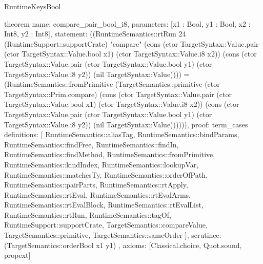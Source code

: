 \begin{lexlean}{RuntimeKeysBool}
\begin{semanticmodule}
theorem{
  name: compare_pair_bool_i8,
  parameters: [x1 : Bool, y1 : Bool, x2 : Int8, y2 : Int8],
  statement: ((RuntimeSemantics::rtRun 24 (RuntimeSupport::supportCrate) "compare" (cons (ctor TargetSyntax::Value.pair (ctor TargetSyntax::Value.bool x1) (ctor TargetSyntax::Value.i8 x2)) (cons (ctor TargetSyntax::Value.pair (ctor TargetSyntax::Value.bool y1) (ctor TargetSyntax::Value.i8 y2)) (nil TargetSyntax::Value)))) = (RuntimeSemantics::fromPrimitive (TargetSemantics::primitive (ctor TargetSyntax::Prim.compare) (cons (ctor TargetSyntax::Value.pair (ctor TargetSyntax::Value.bool x1) (ctor TargetSyntax::Value.i8 x2)) (cons (ctor TargetSyntax::Value.pair (ctor TargetSyntax::Value.bool y1) (ctor TargetSyntax::Value.i8 y2)) (nil TargetSyntax::Value)))))),
  proof: term_cases{
    definitions: [
      RuntimeSemantics::aliasTag,
      RuntimeSemantics::bindParams,
      RuntimeSemantics::findFree,
      RuntimeSemantics::findIn,
      RuntimeSemantics::findMethod,
      RuntimeSemantics::fromPrimitive,
      RuntimeSemantics::kindIndex,
      RuntimeSemantics::lookupVar,
      RuntimeSemantics::matchesTy,
      RuntimeSemantics::orderOfPath,
      RuntimeSemantics::pairParts,
      RuntimeSemantics::rtApply,
      RuntimeSemantics::rtEval,
      RuntimeSemantics::rtEvalArms,
      RuntimeSemantics::rtEvalBlock,
      RuntimeSemantics::rtEvalList,
      RuntimeSemantics::rtRun,
      RuntimeSemantics::tagOf,
      RuntimeSupport::supportCrate,
      TargetSemantics::compareValue,
      TargetSemantics::primitive,
      TargetSemantics::sameOrder
    ],
    scrutinee: (TargetSemantics::orderBool x1 y1)
  },
  axioms: [Classical.choice, Quot.sound, propext]
}


\end{semanticmodule}
\end{lexlean}
